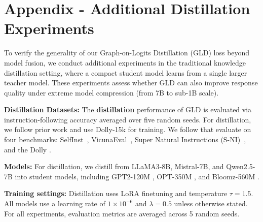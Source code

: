 \documentclass{article}
\begin{document}
\section{Appendix - Additional Distillation Experiments}

To verify the generality of our Graph-on-Logits Distillation (GLD) loss beyond model fusion, we conduct additional experiments in the traditional knowledge distillation setting, where a compact student model learns from a single larger teacher model. These experiments assess whether GLD can also improve response quality under extreme model compression (from 7B to sub-1B scale).

\textbf{Distillation Datasets:}
The \textbf{distillation} performance of GLD is evaluated via instruction-following accuracy averaged over five random seeds. For distillation, we follow prior work and use Dolly-15k \cite{guminillm} for training. We follow \cite{zhang2024dual} that evaluate on four benchmarks: SelfInst~\cite{wang2022self}, VicunaEval~\cite{chiang2023vicuna}, Super Natural Instructions (S-NI)~\cite{wang2022super}, and the Dolly \cite{guminillm}.

\textbf{Models:}
 For distillation, we distill from LLaMA3-8B, Mistral-7B, and Qwen2.5-7B into student models, including GPT2-120M \cite{radford2019language}, OPT-350M \cite{zhang2022opt}, and Bloomz-560M \cite{muennighoff2023crosslingual}.

\textbf{Training settings:}
Distillation uses LoRA finetuning and temperature $\tau=1.5$. All models use a learning rate of $1 \times 10^{-6}$ and $\lambda=0.5$ unless otherwise stated. For all experiments, evaluation metrics are averaged across 5 random seeds.
\end{document}
